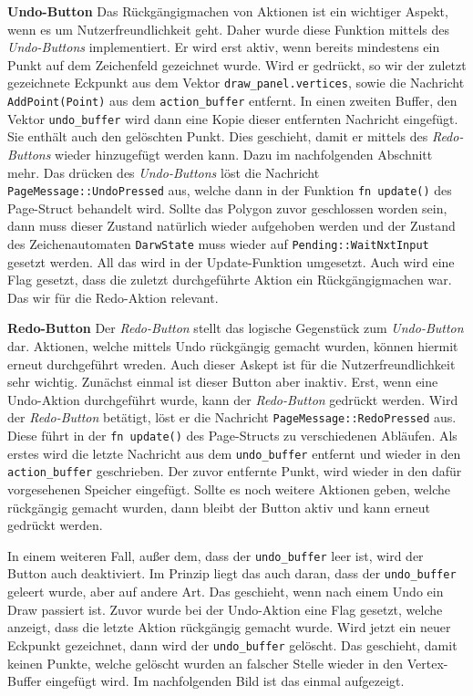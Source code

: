 \textbf{\small{Undo-Button}}\linebreak
Das Rückgängigmachen von Aktionen ist ein wichtiger Aspekt, wenn es um Nutzerfreundlichkeit geht. Daher wurde diese Funktion mittels des \emph{Undo-Buttons} implementiert.
Er wird erst aktiv, wenn bereits mindestens ein Punkt auf dem Zeichenfeld gezeichnet wurde. Wird er gedrückt, so wir der zuletzt gezeichnete Eckpunkt aus dem Vektor \lstinline{draw_panel.vertices}, sowie die Nachricht \lstinline{AddPoint(Point)}
aus dem \lstinline{action_buffer} entfernt. In einen zweiten Buffer, den Vektor \lstinline{undo_buffer} wird dann eine Kopie dieser entfernten Nachricht eingefügt. Sie enthält auch den gelöschten Punkt.
Dies geschieht, damit er mittels des \emph{Redo-Buttons} wieder hinzugefügt werden kann. Dazu im nachfolgenden Abschnitt mehr. Das drücken des \emph{Undo-Buttons} löst die Nachricht 
\lstinline{PageMessage::UndoPressed} aus, welche dann in der Funktion \lstinline{fn update()} des Page-Struct behandelt wird. Sollte das Polygon zuvor geschlossen worden sein, dann muss dieser Zustand natürlich wieder aufgehoben werden und der Zustand 
des Zeichenautomaten \lstinline{DarwState} muss wieder auf \lstinline{Pending::WaitNxtInput} gesetzt werden. All das wird in der Update-Funktion umgesetzt. Auch wird eine Flag gesetzt, dass die zuletzt durchgeführte Aktion ein Rückgängigmachen war. Das wir 
für die Redo-Aktion relevant.\linebreak

\textbf{\small{Redo-Button}}\linebreak
Der \emph{Redo-Button} stellt das logische Gegenstück zum \emph{Undo-Button} dar. Aktionen, welche mittels Undo rückgängig gemacht wurden, können hiermit erneut durchgeführt wreden. Auch dieser Askept ist für die Nutzerfreundlichkeit sehr wichtig.
Zunächst einmal ist dieser Button aber inaktiv. Erst, wenn eine Undo-Aktion durchgeführt wurde, kann der \emph{Redo-Button} gedrückt werden.
Wird der \emph{Redo-Button} betätigt, löst er die Nachricht \lstinline{PageMessage::RedoPressed} aus. Diese führt in der \lstinline{fn update()} des Page-Structs zu verschiedenen Abläufen.
Als erstes wird die letzte Nachricht aus dem \lstinline{undo_buffer} entfernt und wieder in den \lstinline{action_buffer} geschrieben. Der zuvor entfernte Punkt, wird wieder in den dafür vorgesehenen Speicher eingefügt.
Sollte es noch weitere Aktionen geben, welche rückgängig gemacht wurden, dann bleibt der Button aktiv und kann erneut gedrückt werden.

In einem weiteren Fall, außer dem, dass der \lstinline{undo_buffer} leer ist, wird der Button auch deaktiviert. Im Prinzip liegt das auch daran, dass der \lstinline{undo_buffer} geleert wurde, aber auf andere Art.
Das geschieht, wenn nach einem Undo ein Draw passiert ist. Zuvor wurde bei der Undo-Aktion eine Flag gesetzt, welche anzeigt, dass die letzte Aktion rückgängig gemacht wurde. Wird jetzt ein neuer Eckpunkt gezeichnet, 
dann wird der \lstinline{undo_buffer} gelöscht. Das geschieht, damit keinen Punkte, welche gelöscht wurden an falscher Stelle wieder in den Vertex-Buffer eingefügt wird. Im nachfolgenden Bild ist das einmal aufgezeigt.
\linebreak

